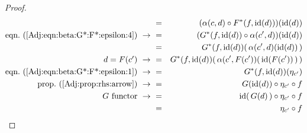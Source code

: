 \begin{proof}
\begin{eqnarray*}
            &=&(\alpha(c,d)\circ F^{*}(f,\id(d)))(\id(d))\\
            \mbox{eqn.~(\ref{Adj:eqn:beta:G*:F*:epsilon:4})}\ \to\ 
            &=&(G^{*}(f,\id(d))\circ\alpha(c',d))(\id(d))\\
            &=&G^{*}(f,\id(d))(\,\alpha(c',d)(\id(d))\,)\\
            \mbox{$d=F(c')$}\ \to\ 
            &=&G^{*}(f,\id(d))(\,\alpha(c',F(c'))(\,\id(F(c'))\,)\,)\\
            \mbox{eqn.~(\ref{Adj:eqn:beta:G*:F*:epsilon:1})}\ \to\ 
            &=&G^{*}(f,\id(d))(\eta_{c'})\\
            \mbox{prop.~(\ref{Adj:prop:rhs:arrow})}\ \to\ 
            &=&G(\id(d))\circ\eta_{c'}\circ f\\
            \mbox{$G$ functor}\ \to\ 
            &=&\id(\,G(d)\,)\circ\eta_{c'}\circ f\\
            &=&\eta_{c'}\circ f\\
        \end{eqnarray*}
\end{proof}



